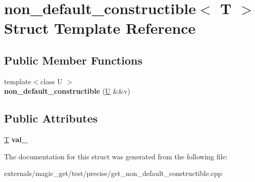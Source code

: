 \hypertarget{structnon__default__constructible}{}\section{non\+\_\+default\+\_\+constructible$<$ T $>$ Struct Template Reference}
\label{structnon__default__constructible}
\subsection*{Public Member Functions}
\begin{DoxyCompactItemize}
\item 
\mbox{\label{structnon__default__constructible_a66271f9c9d84f1486ddd4d208db78e17}} 
{\footnotesize template$<$class U $>$ }\\{\bfseries non\+\_\+default\+\_\+constructible} (\mbox{\hyperlink{union_u}{U}} \&\&v)
\end{DoxyCompactItemize}
\subsection*{Public Attributes}
\begin{DoxyCompactItemize}
\item 
\mbox{\label{structnon__default__constructible_a9af623e9381bb12544997ec73f07faa6}} 
\mbox{\hyperlink{struct_t}{T}} {\bfseries val\+\_\+}
\end{DoxyCompactItemize}


The documentation for this struct was generated from the following file\+:\begin{DoxyCompactItemize}
\item 
externals/magic\+\_\+get/test/precise/get\+\_\+non\+\_\+default\+\_\+constructible.\+cpp\end{DoxyCompactItemize}
